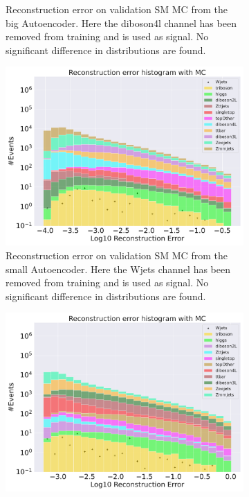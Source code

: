 \begin{figure}[h!]
\begin{subfigure}{.45\textwidth}
        \caption{Reconstruction error on validation SM MC from the big Autoencoder. Here the diboson4l channel has been removed from training and 
        is used as signal. No significant difference in distributions are found. }
        \label{fig:ae_big_diboson4l}
    \end{subfigure}
    \hfill  
    \caption{ }
    \label{fig:ae_big_channel3}
\end{figure}


\begin{figure}[h!]
    \centering
    \begin{subfigure}{.45\textwidth}
        \includegraphics[width=\textwidth]{Figures/AE_testing/small/b_data_recon_big_rm3_feats_sig_Wjets.pdf}
        \caption{Reconstruction error on validation SM MC from the small Autoencoder. Here the Wjets channel has been removed from training and 
        is used as signal. No significant difference in distributions are found.}
        \label{fig:ae_small_Wjets}
    \end{subfigure}
    \hfill 
    \begin{subfigure}{.45\textwidth}
        \includegraphics[width=\textwidth]{Figures/AE_testing/big/b_data_recon_big_rm3_feats_sig_Wjets.pdf}

\end{subfigure}
\end{figure}
